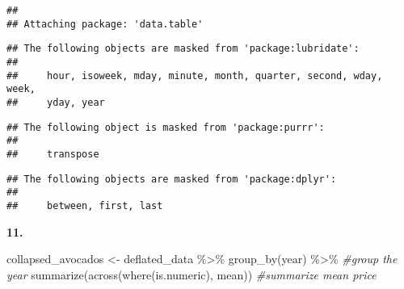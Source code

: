 \documentclass[
]{article}
\newenvironment{Shaded}{\begin{snugshade}}{\end{snugshade}}
\newcommand{\AttributeTok}[1]{\textcolor[rgb]{0.77,0.63,0.00}{#1}}
\newcommand{\CommentTok}[1]{\textcolor[rgb]{0.56,0.35,0.01}{\textit{#1}}}
\newcommand{\DecValTok}[1]{\textcolor[rgb]{0.00,0.00,0.81}{#1}}
\newcommand{\FunctionTok}[1]{\textcolor[rgb]{0.00,0.00,0.00}{#1}}
\newcommand{\NormalTok}[1]{#1}
\newcommand{\OtherTok}[1]{\textcolor[rgb]{0.56,0.35,0.01}{#1}}
\newcommand{\SpecialCharTok}[1]{\textcolor[rgb]{0.00,0.00,0.00}{#1}}
\newcommand{\StringTok}[1]{\textcolor[rgb]{0.31,0.60,0.02}{#1}}
\begin{document}
\begin{verbatim}
## 
## Attaching package: 'data.table'
\end{verbatim}

\begin{verbatim}
## The following objects are masked from 'package:lubridate':
## 
##     hour, isoweek, mday, minute, month, quarter, second, wday, week,
##     yday, year
\end{verbatim}

\begin{verbatim}
## The following object is masked from 'package:purrr':
## 
##     transpose
\end{verbatim}

\begin{verbatim}
## The following objects are masked from 'package:dplyr':
## 
##     between, first, last
\end{verbatim}

\begin{Shaded}
\end{Shaded}

\textbf{11. }

\begin{Shaded}
\begin{Highlighting}[]
\NormalTok{collapsed\_avocados }\OtherTok{\textless{}{-}}\NormalTok{ deflated\_data }\SpecialCharTok{\%\textgreater{}\%} 
  \FunctionTok{group\_by}\NormalTok{(year) }\SpecialCharTok{\%\textgreater{}\%} \CommentTok{\#group the year }
  \FunctionTok{summarize}\NormalTok{(}\FunctionTok{across}\NormalTok{(}\FunctionTok{where}\NormalTok{(is.numeric), mean)) }\CommentTok{\#summarize mean price}
\end{Highlighting}
\end{Shaded}
\end{document}
